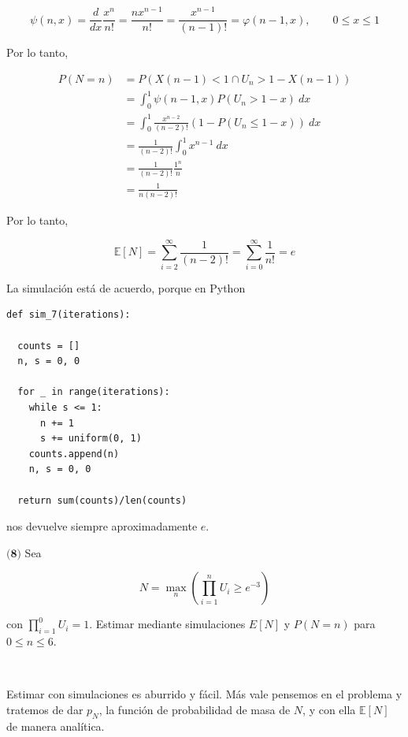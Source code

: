 \documentclass[a4paper, 12pt]{article}
\begin{document}
\begin{equation*}
  \psi(n, x) = \frac{d}{dx} \frac{x^n}{n!} = \frac{nx^{n-1}}{n!} =
  \frac{x^{n-1}}{(n-1)!} = \varphi(n-1, x), \qquad 0 \leq x \leq 1
\end{equation*}

Por lo tanto,

\begin{align*}
  P(N = n) 
  &= P(X(n-1) < 1 \cap U_n > 1 -X(n-1)) \\ 
  &=\int_0^1 \psi(n-1, x) P(U_n > 1 - x) ~ dx \\ 
  &=\int_0^1 \frac{x^{n-2}}{(n-2)!}(1 - P(U_n \leq 1-x)) ~ dx \\ 
  &=\frac{1}{(n-2)!}\int_0^1  x^{n-1} ~ dx \\ 
  &=\frac{1}{(n-2)!} \frac{1^n}{n} \\ 
  &= \frac{1}{n(n-2)!}
\end{align*}

Por lo tanto, 

\begin{equation*}
  \mathbb{E}\left[ N \right] = \sum_{i=2}^\infty \frac{1}{(n-2)!} =
  \sum_{i=0}^\infty \frac{1}{n!} = e
\end{equation*}

La simulación está de acuerdo, porque en Python 

\begin{verbatim}
def sim_7(iterations):

  counts = []
  n, s = 0, 0

  for _ in range(iterations):
    while s <= 1:
      n += 1
      s += uniform(0, 1)
    counts.append(n)
    n, s = 0, 0
 
  return sum(counts)/len(counts)
\end{verbatim}

nos devuelve siempre aproximadamente $e$.

\pagebreak 

\begin{myframe}
$\textbf{(8)}$ Sea  

\begin{equation*}
  N = \max_{n} \left( \prod_{i=1}^n U_i \geq e^{-3} \right) 
\end{equation*}

con $\prod_{i=1}^0 U_i = 1$. Estimar mediante simulaciones $E[N]$ y $P(N = n)$
para $0 \leq n \leq 6$.

\end{myframe}
~

Estimar con simulaciones es aburrido y fácil. Más vale pensemos en el problema y
tratemos de dar $p_N$, la función de probabilidad de masa de $N$, y con ella
$\mathbb{E}\left[ N \right] $ de manera analítica.
\end{document}

